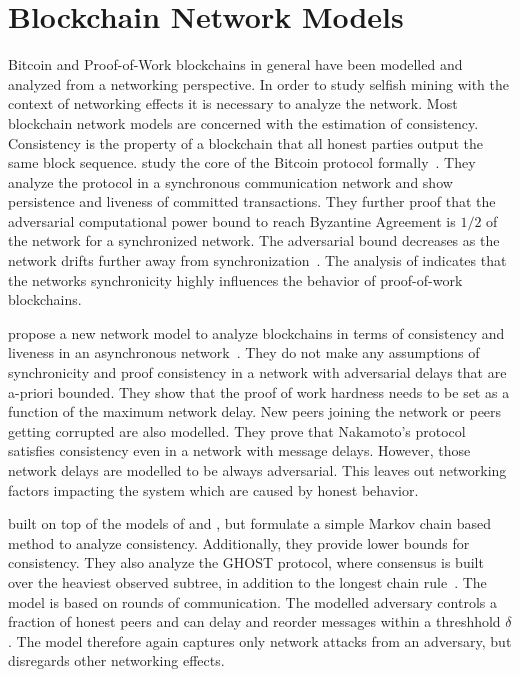 \section{Blockchain Network Models}
Bitcoin and Proof-of-Work blockchains in general have been modelled and analyzed from a networking perspective. In order to study selfish mining with the context of networking effects it is necessary to analyze the network. 
Most blockchain network models are concerned with the estimation of consistency. Consistency is the property of a blockchain that all honest parties output the same block sequence.
\citeauthor{garay2015bitcoin} study the core of the Bitcoin protocol formally~\cite{garay2015bitcoin}. They analyze the protocol in a synchronous communication network and show persistence and liveness of committed transactions. They further proof that the adversarial computational power bound to reach Byzantine Agreement is $1/2$ of the network for a synchronized network. The adversarial bound decreases as the network drifts further away from synchronization~\cite{garay2015bitcoin}.
The analysis of \citeauthor{garay2015bitcoin} indicates that the networks synchronicity highly influences the behavior of proof-of-work blockchains.

\citeauthor{pass2017analysis} propose a new network model to analyze blockchains in terms of consistency and liveness in an asynchronous network~\cite{pass2017analysis}. They do not make any assumptions of synchronicity and proof consistency in a network with adversarial delays that are a-priori bounded. They show that the proof of work hardness needs to be set as a function of the maximum network delay. New peers joining the network or peers getting corrupted are also modelled. They prove that Nakamoto's protocol satisfies consistency even in a network with message delays. However, those network delays are modelled to be always adversarial. This leaves out networking factors impacting the system which are caused by honest behavior.

\citeauthor{kiffer2018better} built on top of the models of \citeauthor{garay2015bitcoin} and \citeauthor{pass2017analysis}, but formulate a simple Markov chain based method to analyze consistency. Additionally, they provide lower bounds for consistency. They also analyze the GHOST protocol, where consensus is built over the heaviest observed subtree, in addition to the longest chain rule~\cite{kiffer2018better}. The model is based on rounds of communication. The modelled adversary controls a fraction of honest peers and  can delay and reorder messages within a threshhold $\delta$. The model therefore again captures only network attacks from an adversary, but disregards other networking effects.

